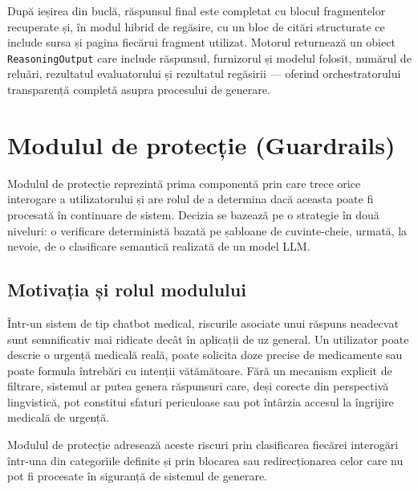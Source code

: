 \documentclass[12pt, a4paper, oneside, romanian]{teza-upb}
\begin{document}
După ieșirea din buclă, răspunsul final este completat cu blocul fragmentelor recuperate și, în modul hibrid de regăsire, cu un bloc de citări structurate ce include sursa și pagina fiecărui fragment utilizat. Motorul returnează un obiect \texttt{ReasoningOutput} care include răspunsul, furnizorul și modelul folosit, numărul de reluări, rezultatul evaluatorului și rezultatul regăsirii — oferind orchestratorului transparență completă asupra procesului de generare.




\section{Modulul de protecție (Guardrails)}

Modulul de protecție reprezintă prima componentă prin care trece orice interogare a utilizatorului și are rolul de a determina dacă aceasta poate fi procesată în continuare de sistem. Decizia se bazează pe o strategie în două niveluri: o verificare deterministă bazată pe șabloane de cuvinte-cheie, urmată, la nevoie, de o clasificare semantică realizată de un model LLM.

\subsection{Motivația și rolul modulului}

Într-un sistem de tip chatbot medical, riscurile asociate unui răspuns neadecvat sunt semnificativ mai ridicate decât în aplicații de uz general. Un utilizator poate descrie o urgență medicală reală, poate solicita doze precise de medicamente sau poate formula întrebări cu intenții vătămătoare. Fără un mecanism explicit de filtrare, sistemul ar putea genera răspunsuri care, deși corecte din perspectivă lingvistică, pot constitui sfaturi periculoase sau pot întârzia accesul la îngrijire medicală de urgență.

Modulul de protecție adresează aceste riscuri prin clasificarea fiecărei interogări într-una din categoriile definite și prin blocarea sau redirecționarea celor care nu pot fi procesate în siguranță de sistemul de generare.
\end{document}
